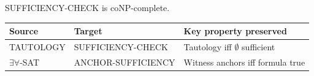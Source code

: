 \begin{theorem}
\label{thm:sufficiency-conp}
SUFFICIENCY-CHECK is coNP-complete.
\end{theorem}

\begin{center}
\begin{tabular}{lll}
\toprule
Source & Target & Key property preserved \\
\midrule
TAUTOLOGY & SUFFICIENCY-CHECK & Tautology iff $\emptyset$ sufficient \\
$\exists\forall$-SAT & ANCHOR-SUFFICIENCY & Witness anchors iff formula true \\
\bottomrule
\end{tabular}
\end{center}


